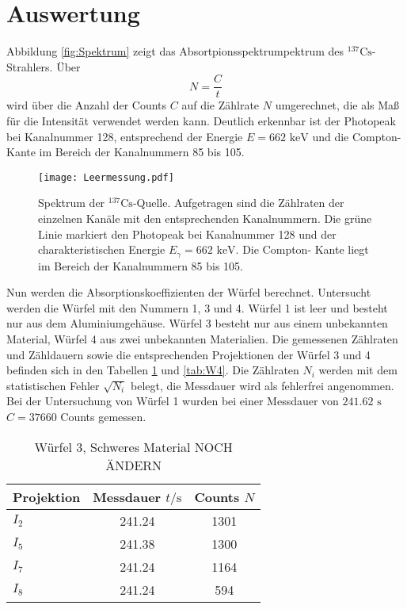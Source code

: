 \section{Auswertung}
Abbildung \ref{fig:Spektrum} zeigt das Absortpionsspektrumpektrum des ${}^{137}\text{Cs}$-Strahlers.
Über 
\begin{equation*}
    N = \frac{C}{t}
\end{equation*}
wird über die Anzahl der Counts $C$ auf die Zählrate $N$ umgerechnet, die als Maß für die Intensität
verwendet werden kann.
Deutlich erkennbar ist der Photopeak bei Kanalnummer 128, entsprechend der Energie $E= 662 \text{ keV}$ 
und die Compton-Kante im Bereich der Kanalnummern 85 bis 105. 
\begin{figure}
    \centering
    \texttt{[image: Leermessung.pdf]}
    \caption{Spektrum der ${}^{137}\text{Cs}$-Quelle. Aufgetragen sind die Zählraten der einzelnen
    Kanäle mit den entsprechenden Kanalnummern. Die grüne Linie markiert den Photopeak bei  
    Kanalnummer 128 und der charakteristischen Energie $E_\gamma = 662 \text{ keV}$. Die Compton-
    Kante liegt im Bereich der Kanalnummern 85 bis 105.}
    \label{fig:spektrum}
\end{figure}
Nun werden die Absorptionskoeffizienten der Würfel berechnet. Untersucht
werden die Würfel mit den Nummern 1, 3 und 4. Würfel 1 ist leer und besteht nur aus dem Aluminiumgehäuse.
Würfel 3 besteht nur aus einem unbekannten Material, Würfel 4 aus zwei unbekannten Materialien. 
Die gemessenen Zählraten und Zähldauern sowie die entsprechenden Projektionen der Würfel 3 und 4 
befinden sich in den Tabellen \ref{tab:W3} und \ref{tab:W4}. Die Zählraten $N_i$ werden mit dem statistischen Fehler $\sqrt{N_i}$
belegt, die Messdauer wird als fehlerfrei angenommen.
Bei der Untersuchung von Würfel 1 wurden bei einer Messdauer von $241.62 \text{ s}$ $C = 37660$ Counts
gemessen.
\FloatBarrier
\begin{table}[h]
    \centering
    \caption{Würfel 3, Schweres Material NOCH ÄNDERN}
    \label{tab:W3}
    \begin{tabular}{l c c}
        \toprule
        {Projektion} & {Messdauer $t/\si{\s}$} & {Counts $N$}\\
        \midrule
        $I_2$ & 241.24 & 1301 \\
        $I_5$ & 241.38 & 1300 \\
        $I_7$ & 241.24 & 1164 \\
        $I_8$ & 241.24 & 594 \\
        \bottomrule
    \end{tabular}
\end{table}
